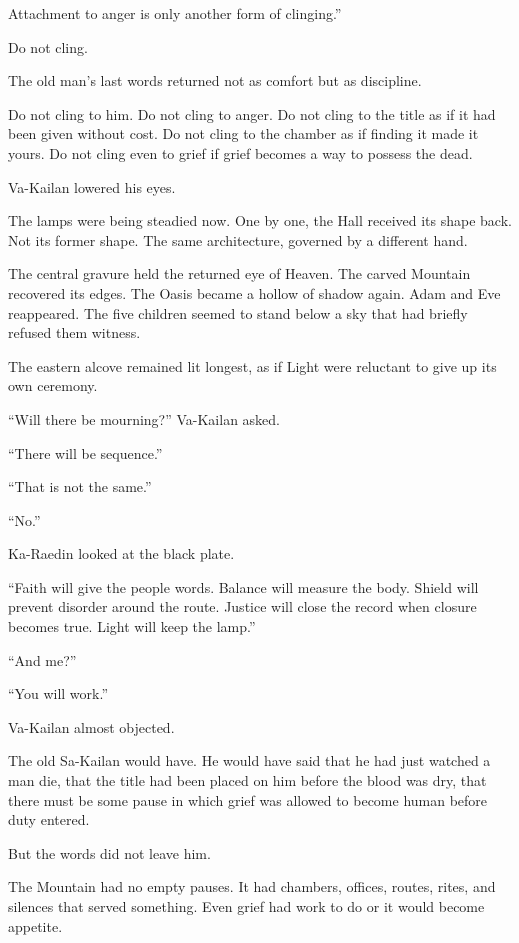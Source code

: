 Attachment to anger is only another form of clinging.”\par
Do not cling.\par
The old man’s last words returned not as comfort but as discipline.\par
Do not cling to him.
Do not cling to anger.
Do not cling to the title as if it had been given without cost.
Do not cling to the chamber as if finding it made it yours.
Do not cling even to grief if grief becomes a way to possess the dead.\par
Va-Kailan lowered his eyes.\par
The lamps were being steadied now.
One by one, the Hall received its shape back.
Not its former shape.
The same architecture, governed by a different hand.\par
The central gravure held the returned eye of Heaven.
The carved Mountain recovered its edges.
The Oasis became a hollow of shadow again.
Adam and Eve reappeared.
The five children seemed to stand below a sky that had briefly refused them witness.\par
The eastern alcove remained lit longest, as if Light were reluctant to give up its own ceremony.\par
“Will there be mourning?” Va-Kailan asked.\par
“There will be sequence.”\par
“That is not the same.”\par
“No.”\par
Ka-Raedin looked at the black plate.\par
“Faith will give the people words.
Balance will measure the body.
Shield will prevent disorder around the route.
Justice will close the record when closure becomes true.
Light will keep the lamp.”\par
“And me?”\par
“You will work.”\par
Va-Kailan almost objected.\par
The old Sa-Kailan would have.
He would have said that he had just watched a man die, that the title had been placed on him before the blood was dry, that there must be some pause in which grief was allowed to become human before duty entered.\par
But the words did not leave him.\par
The Mountain had no empty pauses.
It had chambers, offices, routes, rites, and silences that served something.
Even grief had work to do or it would become appetite.\par
